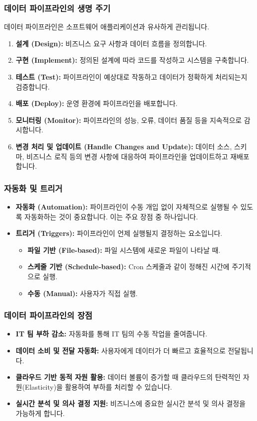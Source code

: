 \documentclass[11pt,a4paper]{article}
\theoremstyle{definition}
\begin{document}
\subsubsection{데이터 파이프라인의 생명 주기}
데이터 파이프라인은 소프트웨어 애플리케이션과 유사하게 관리됩니다.
\begin{enumerate}
    \item \textbf{설계 (Design):} 비즈니스 요구 사항과 데이터 흐름을 정의합니다.
    \item \textbf{구현 (Implement):} 정의된 설계에 따라 코드를 작성하고 시스템을 구축합니다.
    \item \textbf{테스트 (Test):} 파이프라인이 예상대로 작동하고 데이터가 정확하게 처리되는지 검증합니다.
    \item \textbf{배포 (Deploy):} 운영 환경에 파이프라인을 배포합니다.
    \item \textbf{모니터링 (Monitor):} 파이프라인의 성능, 오류, 데이터 품질 등을 지속적으로 감시합니다.
    \item \textbf{변경 처리 및 업데이트 (Handle Changes and Update):} 데이터 소스, 스키마, 비즈니스 로직 등의 변경 사항에 대응하여 파이프라인을 업데이트하고 재배포합니다.
\end{enumerate}

\subsubsection{자동화 및 트리거}
\begin{itemize}
    \item \textbf{자동화 (Automation):} 파이프라인이 수동 개입 없이 자체적으로 실행될 수 있도록 자동화하는 것이 중요합니다. 이는 주요 장점 중 하나입니다.
    \item \textbf{트리거 (Triggers):} 파이프라인이 언제 실행될지 결정하는 요소입니다.
    \begin{itemize}
        \item \textbf{파일 기반 (File-based):} 파일 시스템에 새로운 파일이 나타날 때.
        \item \textbf{스케줄 기반 (Schedule-based):} Cron 스케줄과 같이 정해진 시간에 주기적으로 실행.
        \item \textbf{수동 (Manual):} 사용자가 직접 실행.
    \end{itemize}
\end{itemize}

\subsubsection{데이터 파이프라인의 장점}
\begin{itemize}
    \item \textbf{IT 팀 부하 감소:} 자동화를 통해 IT 팀의 수동 작업을 줄여줍니다.
    \item \textbf{데이터 소비 및 전달 자동화:} 사용자에게 데이터가 더 빠르고 효율적으로 전달됩니다.
    \item \textbf{클라우드 기반 동적 자원 활용:} 데이터 볼륨이 증가할 때 클라우드의 탄력적인 자원(Elasticity)을 활용하여 부하를 처리할 수 있습니다.
    \item \textbf{실시간 분석 및 의사 결정 지원:} 비즈니스에 중요한 실시간 분석 및 의사 결정을 가능하게 합니다.
\end{itemize}
\end{document}
